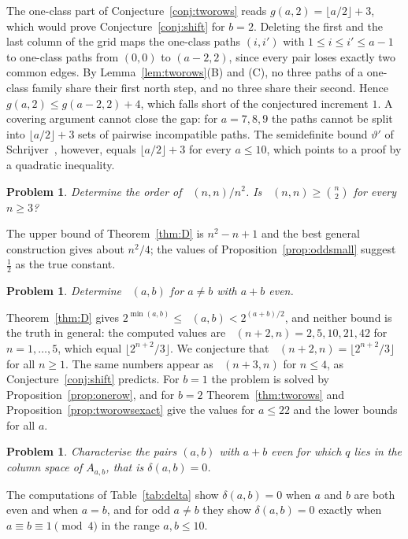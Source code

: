 \documentclass[11pt]{amsart}
\newtheorem{problem}[theorem]{Problem}
\theoremstyle{definition}
\theoremstyle{remark}
\numberwithin{equation}{section}
\DeclareMathOperator{\Meven}{M_{ev}}
\DeclareMathOperator{\Modd}{M_{od}}
\begin{document}
The one-class part of Conjecture~\ref{conj:tworows} reads $g(a,2)=\lfloor a/2\rfloor+3$, which would prove Conjecture~\ref{conj:shift} for $b=2$. Deleting the first and the last column of the grid maps the one-class paths $(i,i')$ with $1\le i\le i'\le a-1$ to one-class paths from $(0,0)$ to $(a-2,2)$, since every pair loses exactly two common edges. By Lemma~\ref{lem:tworows}(B) and (C), no three paths of a one-class family share their first north step, and no three share their second. Hence $g(a,2)\le g(a-2,2)+4$, which falls short of the conjectured increment $1$. A covering argument cannot close the gap: for $a=7,8,9$ the paths cannot be split into $\lfloor a/2\rfloor+3$ sets of pairwise incompatible paths. The semidefinite bound $\vartheta'$ of Schrijver~\cite{Sc}, however, equals $\lfloor a/2\rfloor+3$ for every $a\le10$, which points to a proof by a quadratic inequality.

\begin{problem}\label{prob:oddsquare}
Determine the order of $\Modd(n,n)/n^2$. Is $\Modd(n,n)\ge\binom n2$ for every $n\ge3$?
\end{problem}

The upper bound of Theorem~\ref{thm:D} is $n^2-n+1$ and the best general construction gives about $n^2/4$; the values of Proposition~\ref{prop:oddsmall} suggest $\tfrac12$ as the true constant.

\begin{problem}\label{prob:even}
Determine $\Meven(a,b)$ for $a\ne b$ with $a+b$ even.
\end{problem}

Theorem~\ref{thm:D} gives $2^{\min(a,b)}\le\Meven(a,b)<2^{(a+b)/2}$, and neither bound is the truth in general: the computed values are $\Meven(n+2,n)=2,5,10,21,42$ for $n=1,\dots,5$, which equal $\lfloor 2^{n+2}/3\rfloor$. We conjecture that $\Meven(n+2,n)=\lfloor 2^{n+2}/3\rfloor$ for all $n\ge1$. The same numbers appear as $\Modd(n+3,n)$ for $n\le4$, as Conjecture~\ref{conj:shift} predicts. For $b=1$ the problem is solved by Proposition~\ref{prop:onerow}, and for $b=2$ Theorem~\ref{thm:tworows} and Proposition~\ref{prop:tworowsexact} give the values for $a\le22$ and the lower bounds for all $a$.

\begin{problem}\label{prob:delta}
Characterise the pairs $(a,b)$ with $a+b$ even for which $q$ lies in the column space of $A_{a,b}$, that is $\delta(a,b)=0$.
\end{problem}

The computations of Table~\ref{tab:delta} show $\delta(a,b)=0$ when $a$ and $b$ are both even and when $a=b$, and for odd $a\ne b$ they show $\delta(a,b)=0$ exactly when $a\equiv b\equiv1\pmod4$ in the range $a,b\le10$.
\end{document}
